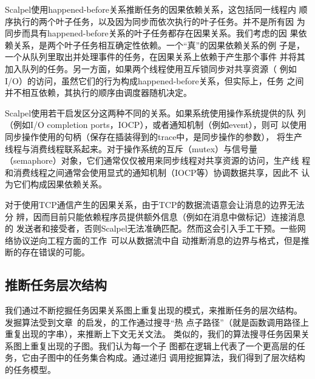 %

Scalpel使用happened-before关系推断任务的因果依赖关系，这包括同一线程内
顺序执行的两个叶子任务，以及因为同步而依次执行的叶子任务。并不是所有因
为同步而具有happened-before关系的叶子任务都存在因果关系。我们考虑的因
果依赖关系，是两个叶子任务相互确定性依赖。一个“真”的因果依赖关系的例
子是，一个从队列里取出并处理事件的任务，在因果关系上依赖于产生那个事件
并将其加入队列的任务。另一方面，如果两个线程使用互斥锁同步对共享资源（
例如I/O）的访问，虽然它们的行为构成happened-before关系，但实际上，任务
之间并不相互依赖，其执行的顺序由调度器随机决定。

Scalpel使用若干启发区分这两种不同的关系。如果系统使用操作系统提供的队
列（例如I/O completion ports，IOCP），或者通知机制（例如event），则可
以使用同步操作使用的句柄（保存在插装得到的trace中，是同步操作的参数），
将生产线程与消费线程联系起来。对于操作系统的互斥（mutex）与信号量
（semaphore）对象，它们通常仅仅被用来同步线程对共享资源的访问，生产线
程和消费线程之间通常会使用显式的通知机制（IOCP等）协调数据共享，因此不
认为它们构成因果依赖关系。

对于使用TCP通信产生的因果关系，由于TCP的数据流语意会让消息的边界无法分
辨，因而目前只能依赖程序员提供额外信息（例如在消息中做标记）连接消息的
发送者和接受者，否则Scalpel无法准确匹配。然而这会引入手工干预。一些网
络协议逆向工程方面的工作~\cite{Caballero2007, Cui2007}可以从数据流中自
动推断消息的边界与格式，但是推断的存在错误的可能。

\subsection{推断任务层次结构}

我们通过不断挖掘任务因果关系图上重复出现的模式，来推断任务的层次结构。
发掘算法受到文章~\cite{wpp}的启发，的工作通过搜寻“热
点子路径”（就是函数调用路径上重复出现的字串），来推断上下文无关文法。
类似的，我们的算法搜寻任务因果关系图上重复出现的子图。我们认为每一个子
图都在逻辑上代表了一个更高层的任务，它由子图中的任务集合构成。通过递归
调用挖掘算法，我们得到了层次结构的任务模型。

